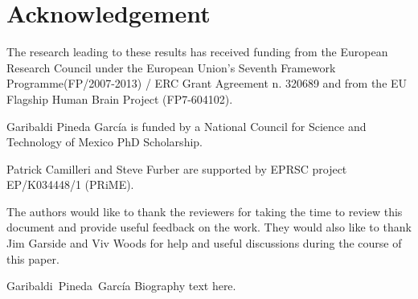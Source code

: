 \documentclass[conference]{IEEEtran}
\begin{document}
\section*{Acknowledgement}
The research leading to these results has received funding from the European Research Council under the European Union's Seventh Framework Programme(FP/2007-2013) / ERC Grant Agreement n. 320689 and from the EU Flagship Human Brain Project (FP7-604102).

Garibaldi Pineda García is funded by a National Council for Science and Technology of Mexico PhD Scholarship.

Patrick Camilleri and Steve Furber are supported by EPRSC project EP/K034448/1 (PRiME). 

The authors would like to thank the reviewers for taking the time to review this document and provide useful feedback on the work. They would also like to thank Jim Garside and Viv Woods for help and useful discussions during the course of this paper.






\begin{IEEEbiography}{Garibaldi~Pineda~García}
  Biography text here.
\end{IEEEbiography}
\end{document}
